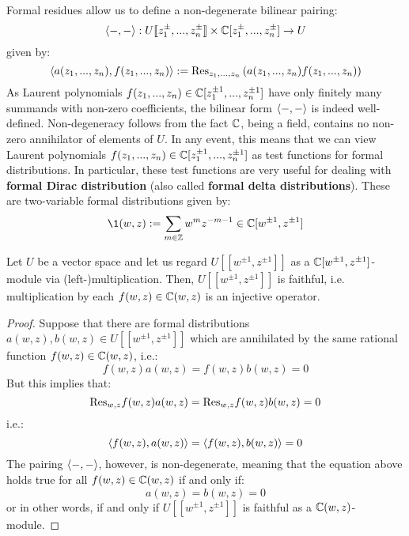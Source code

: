         Formal residues allow us to define a non-degenerate bilinear pairing:
            $$\<-, -\>: U[\![z_1^{\pm}, ..., z_n^{\pm}]\!] \x \bbC[z_1^{\pm}, ..., z_n^{\pm}] \to U$$
        given by:
            $$\langle a(z_1, ..., z_n), f(z_1, ..., z_n) \rangle := \mathrm{Res}_{z_1, ..., z_n} \left( a(z_1, ..., z_n) f(z_1, ..., z_n) \right)$$
        As Laurent polynomials $f(z_1, ..., z_n) \in \mathbb{C}[z_1^{\pm 1}, ..., z_n^{\pm 1}]$ have only finitely many summands with non-zero coefficients, the bilinear form $\langle-, -\rangle$ is indeed well-defined. Non-degeneracy follows from the fact $\mathbb{C}$, being a field, contains no non-zero annihilator of elements of $U$. In any event, this means that we can view Laurent polynomials $f(z_1, ..., z_n) \in \mathbb{C}[z_1^{\pm 1}, ..., z_n^{\pm 1}]$ as test functions for formal distributions. In particular, these test functions are very useful for dealing with \textbf{formal Dirac distribution} (also called \textbf{formal delta distributions}). These are two-variable formal distributions given by:
            $$\1(w, z) := \sum_{m \in \Z} w^m z^{-m - 1} \in \bbC[w^{\pm 1}, z^{\pm 1}]$$

        \begin{lemma}
            Let $U$ be a vector space and let us regard $U[\![w^{\pm 1}, z^{\pm 1}]\!]$ as a $\mathbb{C}[w^{\pm 1}, z^{\pm 1}]$-module via (left-)multiplication. Then, $U[\![w^{\pm 1}, z^{\pm 1}]\!]$ is faithful, i.e. multiplication by each $f(w, z) \in \mathbb{C}(w, z)$ is an injective operator.
        \end{lemma}
            \begin{proof}
                Suppose that there are formal distributions $a(w, z), b(w, z) \in U[\![w^{\pm 1}, z^{\pm 1}]\!]$ which are annihilated by the same rational function $f(w, z) \in \mathbb{C}(w, z)$, i.e.:
                    $$f(w, z) a(w, z) = f(w, z) b(w, z) = 0$$
                But this implies that:
                    $$\mathrm{Res}_{w, z} f(w, z) a(w, z) = \mathrm{Res}_{w, z} f(w, z) b(w, z) = 0$$
                i.e.:
                    $$\langle f(w, z), a(w, z) \rangle = \langle f(w, z), b(w, z) \rangle = 0$$
                The pairing $\langle-, -\rangle$, however, is non-degenerate, meaning that the equation above holds true for all $f(w, z) \in \mathbb{C}(w, z)$ if and only if:
                    $$a(w, z) = b(w, z) = 0$$
                or in other words, if and only if $U[\![w^{\pm 1}, z^{\pm 1}]\!]$ is faithful as a $\mathbb{C}(w, z)$-module.
            \end{proof}
        
